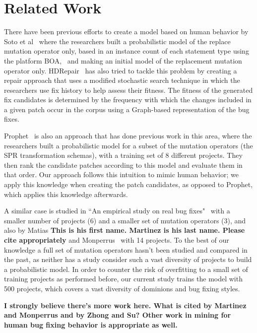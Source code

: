 \documentclass[conference]{IEEEtran}
\newcommand{\todo}[1]
  {{\scriptsize \textbf{\color{red} {#1}}}}
\begin{document}
\section{Related Work} \label{relatedWork}

There have been previous efforts to create a model based on human behavior by Soto et al~\cite{Soto15} 
where the researchers built a probabilistic model of the replace mutation 
operator only, based in 
an instance count of each statement type using the platform 
BOA,~\cite{dyer2013} and making an initial model of the replacement mutation 
operator only. HDRepair~\cite{xuan16} has also tried to tackle this problem by 
creating a repair approach that uses a modified stochastic search
technique in which the researchers use fix history
to help assess their fitness. The fitness of the generated
fix candidates is determined by the frequency with which the changes included in a given patch occur in the corpus using a Graph-based representation of the bug fixes.

Prophet~\cite{long15} is also an approach that has done previous work in this 
area, where the researchers built a 
probabilistic model for a subset of the mutation operators (the SPR transformation schemas), with a training set 
of 8 different projects. They then rank the candidate patches according to this model and evaluate them in that order. Our approach follows this intuition to mimic human behavior; we apply this knowledge when creating the patch candidates, as opposed to Prophet, which applies this knowledge afterwards. 

A similar case is studied in ``An empirical study on 
real bug fixes"~\cite{zhong15} with a smaller number of projects (6) and a 
smaller set of 
mutation operators (3), and also by Matias\todo{This is his first name.
  Martinez is his last name.  Please cite appropriately} and Monperrus~\cite{matias15} with 14 
projects. To the best of our knowledge a full set of mutation 
operators hasn't been studied and compared in the past, as neither has a study 
consider such a vast diversity of projects to build a probabilistic model. In 
order to counter the 
risk of overfitting to a small set of training projects as performed before, our 
current study trains the model with 500 projects, which covers a vast diversity 
of dominions and bug fixing styles.

\todo{I strongly believe there's more work here.  What is cited by Martinez and
  Monperrus and by Zhong and Su?  Other work in mining for human bug fixing
  behavior is appropriate as well.}
\end{document}
